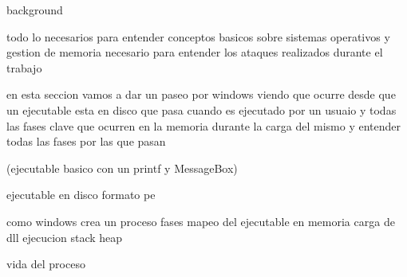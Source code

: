 background

todo lo necesarios para entender conceptos basicos sobre sistemas operativos y gestion de memoria
necesario para entender los ataques realizados durante el trabajo

en esta seccion vamos a dar un paseo por windows viendo que ocurre desde que un ejecutable esta en disco
que pasa cuando es ejecutado por un usuaio y todas las fases clave que ocurren en la memoria durante la carga del mismo
y entender todas las fases por las que pasan

(ejecutable basico con un printf y MessageBox)

ejecutable en disco
formato pe

como windows crea un proceso
fases
mapeo del ejecutable en memoria
carga de dll
ejecucion
stack
heap


vida del proceso
